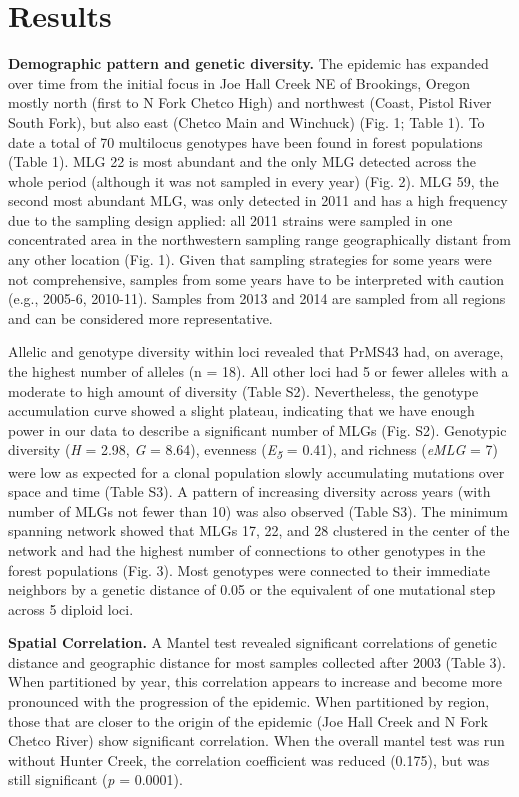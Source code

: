 \documentclass[double,12pt]{beavtex}
\begin{document}
  \section{Results}\label{results}
  
  \textbf{Demographic pattern and genetic diversity.} The epidemic has
  expanded over time from the initial focus in Joe Hall Creek NE of
  Brookings, Oregon mostly north (first to N Fork Chetco High) and
  northwest (Coast, Pistol River South Fork), but also east (Chetco Main
  and Winchuck) (Fig. 1; Table 1). To date a total of 70 multilocus
  genotypes have been found in forest populations (Table 1). MLG 22 is
  most abundant and the only MLG detected across the whole period
  (although it was not sampled in every year) (Fig. 2). MLG 59, the second
  most abundant MLG, was only detected in 2011 and has a high frequency
  due to the sampling design applied: all 2011 strains were sampled in one
  concentrated area in the northwestern sampling range geographically
  distant from any other location (Fig. 1). Given that sampling strategies
  for some years were not comprehensive, samples from some years have to
  be interpreted with caution (e.g., 2005-6, 2010-11). Samples from 2013
  and 2014 are sampled from all regions and can be considered more
  representative.
  
  Allelic and genotype diversity within loci revealed that PrMS43 had, on
  average, the highest number of alleles (n = 18). All other loci had 5 or
  fewer alleles with a moderate to high amount of diversity (Table S2).
  Nevertheless, the genotype accumulation curve showed a slight plateau,
  indicating that we have enough power in our data to describe a
  significant number of MLGs (Fig. S2). Genotypic diversity (\emph{H} =
  2.98, \emph{G} = 8.64), evenness (\emph{E\textsubscript{5}} = 0.41), and
  richness (\emph{eMLG} = 7) were low as expected for a clonal population
  slowly accumulating mutations over space and time (Table S3). A pattern
  of increasing diversity across years (with number of MLGs not fewer than
  10) was also observed (Table S3). The minimum spanning network showed
  that MLGs 17, 22, and 28 clustered in the center of the network and had
  the highest number of connections to other genotypes in the forest
  populations (Fig. 3). Most genotypes were connected to their immediate
  neighbors by a genetic distance of 0.05 or the equivalent of one
  mutational step across 5 diploid loci.
  
  \textbf{Spatial Correlation.} A Mantel test revealed significant
  correlations of genetic distance and geographic distance for most
  samples collected after 2003 (Table 3). When partitioned by year, this
  correlation appears to increase and become more pronounced with the
  progression of the epidemic. When partitioned by region, those that are
  closer to the origin of the epidemic (Joe Hall Creek and N Fork Chetco
  River) show significant correlation. When the overall mantel test was
  run without Hunter Creek, the correlation coefficient was reduced
  (0.175), but was still significant (\emph{p} = 0.0001).
  
\end{document}
